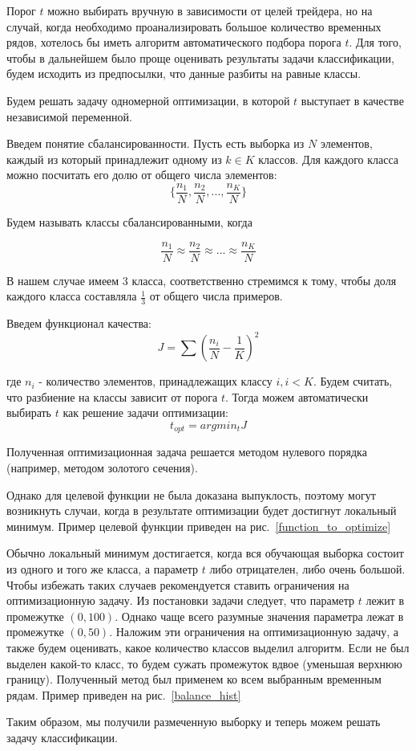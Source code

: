 \documentclass[a4paper,article,14pt]{extarticle}
\begin{document}
Порог $t$ можно выбирать вручную в зависимости от целей трейдера, но на случай, когда необходимо проанализировать большое количество временных рядов, хотелось бы иметь алгоритм автоматического подбора порога $t$.
Для того, чтобы в дальнейшем было проще оценивать результаты задачи классификации, будем исходить из предпосылки, что данные разбиты на равные классы.

Будем решать задачу одномерной оптимизации, в которой $t$ выступает в качестве независимой переменной.

Введем понятие сбалансированности.
Пусть есть выборка из $N$ элементов, каждый из который принадлежит одному из $k \in K$ классов.
Для каждого класса можно посчитать его долю от общего числа элементов:
$$ \{ \frac{n_1}{N}, \frac{n_2}{N}, ... , \frac{n_K}{N} \} $$

Будем называть классы сбалансированными, когда

$$\frac{n_1}{N} \approx \frac{n_2}{N} \approx ... \approx \frac{n_K}{N}$$

В нашем случае имеем 3 класса, соответственно стремимся к тому, чтобы доля каждого класса составляла $\frac{1}{3}$ от общего числа примеров.

Введем функционал качества:
$$J=\sum{(\frac{n_i}{N} - \frac{1}{K}) ^ 2}$$

где $n_i$ - количество элементов, принадлежащих классу $i, i < K$.
Будем считать, что разбиение на классы зависит от порога $t$.
Тогда можем автоматически выбирать $t$ как решение задачи оптимизации:
$$t_{opt} = argmin_t J$$

Полученная оптимизационная задача решается методом нулевого порядка (например, методом золотого сечения).

Однако для целевой функции не была доказана выпуклость, поэтому могут возникнуть случаи, когда в результате оптимизации будет достигнут локальный минимум.
Пример целевой функции приведен на рис.~\ref{function_to_optimize}

Обычно локальный минимум достигается, когда вся обучающая выборка состоит из одного и того же класса, а параметр $t$ либо отрицателен, либо очень большой.
Чтобы избежать таких случаев рекомендуется ставить ограничения на оптимизационную задачу.
Из постановки задачи следует, что параметр $t$ лежит в промежутке $(0, 100)$.
Однако чаще всего разумные значения параметра лежат в промежутке $(0, 50)$.
Наложим эти ограничения на оптимизационную задачу, а также будем оценивать, какое количество классов выделил алгоритм.
Если не был выделен какой-то класс, то будем сужать промежуток вдвое (уменьшая верхнюю границу).
\linebreak
Полученный метод был применем ко всем выбранным временным рядам.
Пример приведен на рис.~\ref{balance_hist}

Таким образом, мы получили размеченную выборку и теперь можем решать задачу классификации.
\end{document}
